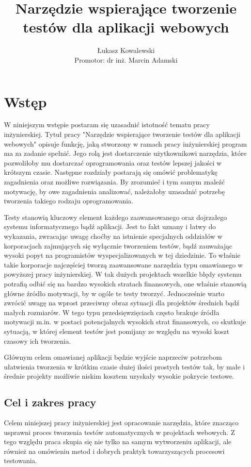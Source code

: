 \documentclass[12pt]{report}
\title{Narzędzie wspierające tworzenie testów dla aplikacji webowych}
\author{
    Łukasz Kowalewski \\ %
    \vspace{0.5cm} %
    Promotor: dr inż. Marcin Adamski %
}
\date{}
\begin{document}
\maketitle

\tableofcontents
\newpage

\chapter{Wstęp}
W niniejszym wstępie postaram się uzasadnić istotność tematu pracy inżynierskiej. Tytuł pracy "Narzędzie wspierające tworzenie testów dla aplikacji webowych" opisuje funkcję, jaką stworzony w ramach pracy inżynierskiej program ma za zadanie spełnić. Jego rolą jest dostarczenie użytkownikowi narzędzia, które pozwoliłoby mu dostarczać oprogramowania oraz testów lepszej jakości w krótszym czasie. Następne rozdziały postarają się omówić problematykę zagadnienia oraz możliwe rozwiązania. By zrozumieć i tym samym znaleźć motywację, by owe zagadnienia analizować, należałoby uzasadnić potrzebę tworzenia takiego rodzaju oprogramowania.

Testy stanowią kluczowy element każdego zaawansowanego oraz dojrzałego systemu informatycznego bądź aplikacji. Jest to fakt uznany i łatwy do wykazania, zwracając uwagę choćby na istnienie specjalnych oddziałów w korporacjach zajmujących się wyłącznie tworzeniem testów, bądź zauważając wysoki popyt na programistów wyspecjalizowanych w tej dziedzinie. To właśnie takie korporacje najczęściej tworzą zaawansowane narzędzia typu omawianego w powyższej pracy inżynierskiej. W tak dużych projektach wszelkie błędy systemu potrafią odbić się na bardzo wysokich stratach finansowych, one właśnie stanowią główne źródło motywacji, by w ogóle te testy tworzyć. Jednocześnie warto zwrócić uwagę na wprost przeciwny obraz sytuacji dla projektów średnich bądź małych rozmiarów. W tego typu przedsięwzięciach często brakuje źródła motywacji m.in. w postaci potencjalnych wysokich strat finansowych, co skutkuje sytuacją, w której element testów jest pomijany ze względu na wysoki koszt czasowy ich tworzenia.

Głównym celem omawianej aplikacji będzie wyjście naprzeciw potrzebom ułatwienia tworzenia w krótkim czasie dużej ilości prostych testów tak, by małe i średnie projekty możliwie niskim kosztem uzyskały wysokie pokrycie testowe.

\section{Cel i zakres pracy}
Celem niniejszej pracy inżynierskiej jest opracowanie narzędzia, które znacząco usprawni proces tworzenia testów automatycznych w projektach webowych. Z tego względu praca skupia się nie tylko na samym wytworzeniu aplikacji, ale również na omówieniu metod i dobrych praktyk towarzyszących procesowi testowania. 
\end{document}
